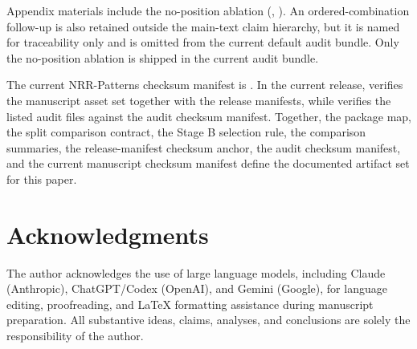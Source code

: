 \documentclass[11pt,a4paper]{article}
\begin{document}
Appendix materials include the no-position ablation
(, ).
An ordered-combination follow-up is also retained outside the main-text claim
hierarchy, but it is named for traceability only and is omitted from the
current default audit bundle. Only the no-position ablation is shipped in the
current audit bundle.

The current NRR-Patterns checksum manifest is
. In the current
release,  verifies the manuscript asset
set together with the release manifests, while
 verifies the listed audit files
against the audit checksum manifest. Together, the package map, the split
comparison contract, the Stage B selection rule, the comparison summaries, the
release-manifest checksum anchor, the audit checksum manifest, and the current
manuscript checksum manifest define the documented artifact set for this paper.

\section*{Acknowledgments}
The author acknowledges the use of large language models, including Claude
(Anthropic), ChatGPT/Codex (OpenAI), and Gemini (Google), for language
editing, proofreading, and LaTeX formatting assistance during manuscript
preparation. All substantive ideas, claims, analyses, and conclusions are
solely the responsibility of the author.
\end{document}
